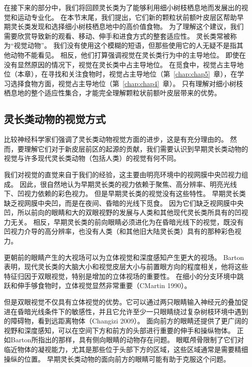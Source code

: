 在接下来的部分中，我们将回顾灵长类为了能够利用细小树枝栖息地而发展出的视觉和运动专业化。
在本节末尾，我们提出，它们新的颗粒状前额叶皮层区帮助早期灵长类发现和选择细小树枝栖息地中的高价值食物。
为了理解这个建议，我们需要欣赏导致新的观看、移动、伸手和进食方式的整套适应性。
灵长类常被称为“视觉动物”。
我们没有使用这个模糊的短语，但那些使用它的人无疑不是指其他动物不能看见。
相反，他们打算强调视觉在灵长类行为中的主导地位。
即使在没有显然原因的情况下，视觉在灵长类中占主导地位。
在觅食中，视觉占主导地位（本章），在寻找和关注食物时，视觉占主导地位（第~\ref{chap:chap5}~章），在学习选择食物方面，视觉占主导地位（第~\ref{chap:chap4}~章）。
只有理解对细小树枝栖息地的整个适应性集合，才能完全理解颗粒状前额叶皮层带来的优势。



\subsection{灵长类动物的视觉方式}

比较神经科学家们强调了灵长类动物视觉方面的进步，这是有充分理由的。
然而，要理解它们对于新皮层前区的起源的贡献，我们需要认识到早期灵长类动物的视觉与许多现代灵长类动物（包括人类）的视觉有何不同。


我们对视觉的直觉来自于我们的经验，这主要由明亮环境中的视网膜中央凹视力组成。
因此，很自然地认为早期灵长类的视力依赖于聚焦、高分辨率、明亮光线下、凹视力依赖的彩色视力。
但是早期灵长类的视觉没有这些特性。
早期灵长类缺乏视网膜中央凹，而是在夜间、昏暗的光线下觅食。
因为它们缺乏视网膜中央凹，所以前向的眼睛和大的双眼视野的发展与人类和其他现代灵长类所具有的凹视力无关。
相反，早期灵长类的前向眼睛必须进化为在昏暗光线下的视觉，既没有凹视力介导的高分辨率，也没有人类（和其他旧大陆灵长类）具有的那种彩色视力。


更朝前的眼睛产生的大视场可以为立体视觉和深度感知产生更大的视场。
Barton\cite{barton1998visual}表明，现代灵长类的大脑大小和视觉皮层大小与前置眼方向的程度相关，他将这些特征归因于双眼视觉，特别是增加的立体视场的重要性。
在细小的分支环境中跳跃和伸手够食物时，立体视觉显然非常重要\cite{cartmill1974rethinking}（CMartin 1990）。


但是双眼视觉不仅具有立体视觉的优势。它可以通过两只眼睛输入神经元的叠加促进在昏暗光线条件下的敏感性\cite{crescitelli1977topography,allman1999evolving}，并且它允许至少一只眼睛绕过复杂树枝环境中遇到的障碍物，看到远距离物体（Changizi 2009）。
面向前方的眼睛还提供了更广阔的视野和深度感知，可以在空间下方和前方的头部进行重要的伸手和操纵物体\cite{barton2004binocularity}。
正如Barton所指出的那样，具有侧向眼睛的动物存在问题。
眼眶颅骨限制了它们对临近物体的凝视能力，尤其是那些位于头部下方的区域，这些区域通常是需要精细操纵的位置。
早期灵长类动物的面向前方的眼睛可能有助于克服这个问题。


